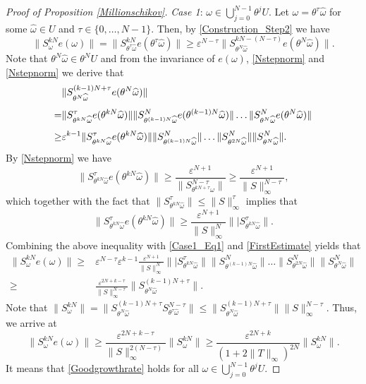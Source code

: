 \documentclass[pdflatex,sn-mathphys-num]{sn-jnl}%
\theoremstyle{thmstyleone}%
\theoremstyle{thmstyletwo}%
\theoremstyle{thmstylethree}%
\newcommand{\eps}{\varepsilon}
\numberwithin{equation}{section}
\begin{document}
\begin{proof}[Proof of Proposition \ref{Millionschikov}]
\noindent
\emph{Case 1}: $\omega\in \bigcup_{j=0}^{N-1}\theta^j U$. Let $\omega=\theta^{\tau}\widehat \omega$ for some $\widehat\omega\in U$ and $\tau\in\{0,\dots,N-1\}$. Then, by \eqref{Construction_Step2} we have 
\begin{equation}\label{Case1_Eq1}
\|S_{\omega}^{kN} e(\omega)\|=\|S_{\theta^{\tau}\widehat\omega}^{kN}e(\theta^{\tau}\widehat\omega)\|\geq \eps^{N-\tau} \|S_{\theta^N\widehat\omega}^{kN-(N-\tau)}e(\theta^N\widehat\omega)\|.
\end{equation}
Note that $\theta^N\widehat\omega\in \theta^N U$ and from the invariance of $e(\omega)$, \eqref{Nstepnorm} and \eqref{Nstepnorm}  we derive that 
\begin{align}
&\|S_{\theta^N\widehat\omega}^{(k-1)N+\tau}e(\theta^N\widehat\omega)\|\notag\\[1ex]
=&\|S_{\theta^{kN}\widehat\omega}^{\tau}e(\theta^{kN}\widehat\omega)\| \|S^{N}_{\theta^{(k-1)N}\widehat\omega}e(\theta^{(k-1)N}\widehat\omega)\|\dots\|S^N_{\theta^N\widehat\omega}e(\theta^N\widehat\omega)\|\notag\\[1ex]
\geq& 
\eps^{k-1}\|S_{\theta^{kN}\widehat\omega}^{\tau}e(\theta^{kN}\widehat\omega)\| \|S^{N}_{\theta^{(k-1)N}\widehat\omega}\|\dots\|S^N_{\theta^{2N}\widehat\omega}\|\|S^N_{\theta^N\widehat\omega}\|.\label{FirstEstimate}
\end{align}
By \eqref{Nstepnorm} we have 
\[
\|S_{\theta^{kN}\widehat\omega}^{\tau}e(\theta^{kN}\widehat\omega)\|\geq \frac{\eps^{N+1}}{\|S_{\theta^{kN+\tau}\widehat\omega}^{N-\tau}\|}
\geq 
\frac{\eps^{N+1}}{\|S\|_{\infty}^{N-\tau}},
\]
which together with the fact that $\|S_{\theta^{kN}\widehat\omega}^{\tau}\|\leq \|S\|_{\infty}^{\tau}$ implies that 
\[
\|S_{\theta^{kN}\widehat\omega}^{\tau}e(\theta^{kN}\widehat\omega)\|
\geq
\frac{\eps^{N+1}}{\|S\|_{\infty}^{N}} \||S_{\theta^{kN}\widehat\omega}^{\tau}\|.
\]
Combining the above inequality with \eqref{Case1_Eq1} and \eqref{FirstEstimate} yields that 
\begin{align*}
\|S_{\omega}^{kN}e(\omega)\|
\geq &
\eps^{N-\tau}\eps^{k-1}
\frac{\eps^{N+1}}{\|S\|_{\infty}^N} \||S_{\theta^{kN}\widehat\omega}^{\tau}\|\|S^{N}_{\theta^{(k-1)N}\widehat\omega}\|\dots\|S^N_{\theta^{2N}\widehat\omega}\|\|S^N_{\theta^N\widehat\omega}\|\\[1ex]
\geq &
\frac{\eps^{2N+k-\tau}}{\|S\|_{\infty}^{N-\tau}}\|S_{\theta^N\widehat\omega}^{(k-1)N+\tau}\|.
\end{align*}
Note that $\|S_{\omega}^{kN}\|=\|S_{\theta^N\widehat\omega}^{(k-1)N+\tau}S_{\theta^{\tau}\widehat\omega}^{N-\tau}\|
\leq \|S_{\theta^N\widehat\omega}^{(k-1)N+\tau}\|\|S\|_{\infty}^{N-\tau}$. Thus, we arrive at 
\[
\|S_{\omega}^{kN}e(\omega)\|
\geq 
\frac{\eps^{2N+k-\tau}}{\|S\|_{\infty}^{2(N-\tau)}}\|S_{\omega}^{kN}\|
\geq 
\frac{\eps^{2N+k}}{( 1+2\|T\|_{\infty})^{2N}}\|S_{\omega}^{kN}\|.
\]
It means that \eqref{Goodgrowthrate} holds for all $\omega\in \bigcup_{j=0}^{N-1}\theta^j U$.


\end{proof}
\end{document}
